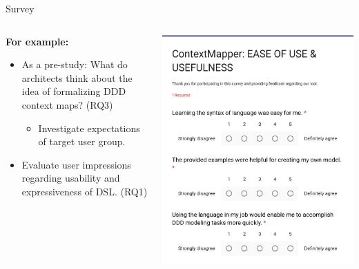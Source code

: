 \documentclass[10pt]{beamer}
\begin{document}
\begin{frame}{Survey}
	\begin{columns}[T] %
		\begin{column}{.48\textwidth}
			\textbf{For example:}
			\begin{itemize}
				\item As a pre-study: What do architects think about the idea of formalizing DDD context maps? (RQ3)
				\begin{itemize}
					\item Investigate expectations of target user group.
				\end{itemize}			
				\bigskip
				\item Evaluate user impressions regarding usability and expressiveness of DSL. (RQ1)
			\end{itemize}					
		\end{column}
		\hfill
		\begin{column}{.48\textwidth}
			\includegraphics[width=1.0\linewidth]{./images/survey_example.png}
		\end{column}
	\end{columns}
\end{frame}
\end{document}
